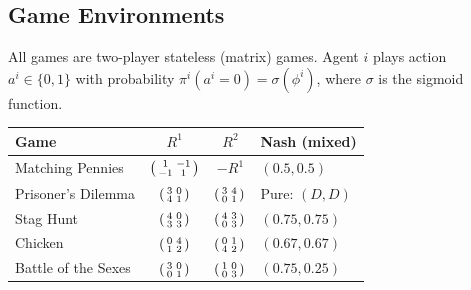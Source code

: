 \documentclass[11pt,a4paper]{article}
\begin{document}
\subsection{Game Environments}

All games are two-player stateless (matrix) games. Agent $i$ plays action $a^i \in \{0, 1\}$ with probability $\pi^i(a^i = 0) = \sigma(\phi^i)$, where $\sigma$ is the sigmoid function.

\begin{center}
\begin{tabular}{lccl}
\toprule
\textbf{Game} & $R^1$ & $R^2$ & \textbf{Nash (mixed)} \\
\midrule
Matching Pennies & $\begin{psmallmatrix} 1 & -1 \\ -1 & 1 \end{psmallmatrix}$ & $-R^1$ & $(0.5, 0.5)$ \\[0.8em]
Prisoner's Dilemma & $\begin{psmallmatrix} 3 & 0 \\ 4 & 1 \end{psmallmatrix}$ & $\begin{psmallmatrix} 3 & 4 \\ 0 & 1 \end{psmallmatrix}$ & Pure: $(D, D)$ \\[0.8em]
Stag Hunt & $\begin{psmallmatrix} 4 & 0 \\ 3 & 3 \end{psmallmatrix}$ & $\begin{psmallmatrix} 4 & 3 \\ 0 & 3 \end{psmallmatrix}$ & $(0.75, 0.75)$ \\[0.8em]
Chicken & $\begin{psmallmatrix} 0 & 4 \\ 1 & 2 \end{psmallmatrix}$ & $\begin{psmallmatrix} 0 & 1 \\ 4 & 2 \end{psmallmatrix}$ & $(0.67, 0.67)$ \\[0.8em]
Battle of the Sexes & $\begin{psmallmatrix} 3 & 0 \\ 0 & 1 \end{psmallmatrix}$ & $\begin{psmallmatrix} 1 & 0 \\ 0 & 3 \end{psmallmatrix}$ & $(0.75, 0.25)$ \\
\bottomrule
\end{tabular}
\end{center}
\end{document}

